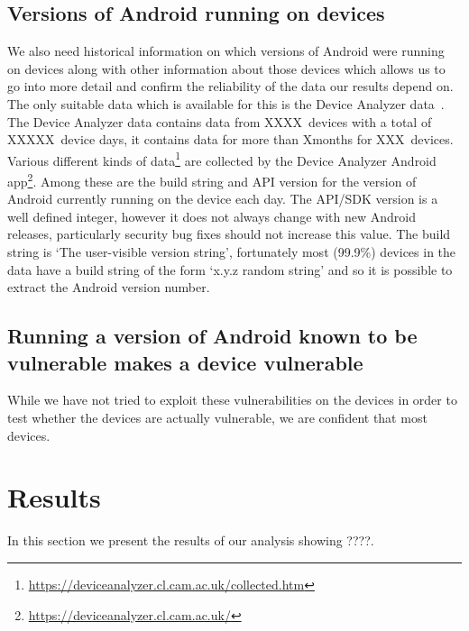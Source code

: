 \documentclass[conference,a4paper,twoside]{IEEEtran}
\newcommand{\daNumDevices}{XXXX}
\newcommand{\daDeviceDays}{XXXXX}
\newcommand{\daMonths}{X}%
\newcommand{\daMonthsDevices}{XXX}
\begin{document}
\subsection{Versions of Android running on devices}
We also need historical information on which versions of Android were running on devices along with other information about those devices which allows us to go into more detail and confirm the reliability of the data our results depend on.
The only suitable data which is available for this is the Device Analyzer data~\cite{Wagner2013}.
The Device Analyzer data contains data from \daNumDevices\ devices with a total of \daDeviceDays\ device days, it contains data for more than \daMonths months for \daMonthsDevices\ devices.
Various different kinds of data\footnote{\url{https://deviceanalyzer.cl.cam.ac.uk/collected.htm}} are collected by the Device Analyzer Android app\footnote{\url{https://deviceanalyzer.cl.cam.ac.uk/}}.
Among these are the build string and API version for the version of Android currently running on the device each day.
The API/SDK version is a well defined integer, however it does not always change with new Android releases, particularly security bug fixes should not increase this value.
The build string is `The user-visible version string', fortunately most (99.9\%) devices in the data have a build string of the form `x.y.z random string' and so it is possible to extract the Android version number.

\subsection{Running a version of Android known to be vulnerable makes a device vulnerable}
While we have not tried to exploit these vulnerabilities on the devices in order to test whether the devices are actually vulnerable, we are confident that most devices.

\section{Results}
\label{sec:results}
In this section we present the results of our analysis showing ????. %
\end{document}
